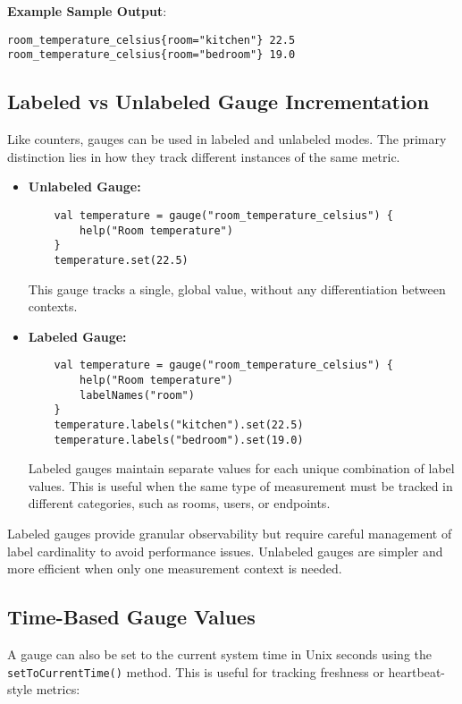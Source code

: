 \vspace{0.5em}
\noindent
\textbf{Example Sample Output}:
\begin{verbatim}
room_temperature_celsius{room="kitchen"} 22.5
room_temperature_celsius{room="bedroom"} 19.0
\end{verbatim}

\subsection{Labeled vs Unlabeled Gauge Incrementation}

Like counters, gauges can be used in labeled and unlabeled modes. The primary distinction lies in how they track different instances of the same metric.

\begin{itemize}
  \item \textbf{Unlabeled Gauge:}
    \begin{verbatim}
    val temperature = gauge("room_temperature_celsius") {
        help("Room temperature")
    }
    temperature.set(22.5)
    \end{verbatim}
    This gauge tracks a single, global value, without any differentiation between contexts.

  \item \textbf{Labeled Gauge:}
    \begin{verbatim}
    val temperature = gauge("room_temperature_celsius") {
        help("Room temperature")
        labelNames("room")
    }
    temperature.labels("kitchen").set(22.5)
    temperature.labels("bedroom").set(19.0)
    \end{verbatim}
    Labeled gauges maintain separate values for each unique combination of label values. This is useful when the same type of measurement must be tracked in different categories, such as rooms, users, or endpoints.
\end{itemize}

Labeled gauges provide granular observability but require careful management of label cardinality to avoid performance issues. Unlabeled gauges are simpler and more efficient when only one measurement context is needed.



\subsection{Time-Based Gauge Values}
A gauge can also be set to the current system time in Unix seconds using the \texttt{setToCurrentTime()} method. This is useful for tracking freshness or heartbeat-style metrics:

